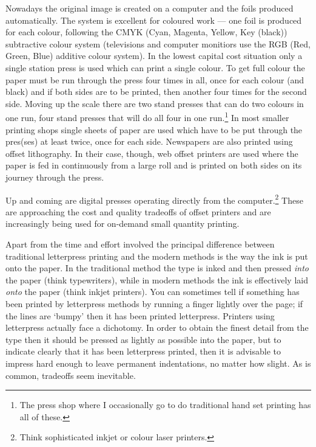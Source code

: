 \documentclass[10pt,letterpaper,extrafontsizes]{memoir}
\begin{document}
    Nowadays the original image is created on a computer and the foils
produced automatically. The system is excellent for coloured work --- one foil
is produced for each colour, following the CMYK
(Cyan, Magenta, Yellow, Key (black)) subtractive colour system 
(televisions and computer monitiors use the RGB (Red, Green, Blue) 
additive colour system). In the lowest capital cost situation only a
single station press is used which can print a single colour. To get full
colour the paper must be run through the press four times in all, once for
each colour (and black) and if both sides are to be printed, then another
four times for the second side. Moving up
the scale there are two stand presses that can do two colours in one run,
four stand presses that will do all four in one run.\footnote{The press shop
where I occasionally go to do traditional hand set printing has all of these.} 
In most
smaller printing shops single sheets of paper are used which have to be put 
through the pres(ses) at least twice, once for each side. Newspapers are
also printed using offset lithography. In their case, though, web offset
printers are used where the paper is fed in continuously from a large roll and
is printed on both sides on its journey through the press.

    Up and coming are digital presses operating directly from the 
computer.\footnote{Think sophisticated inkjet or colour laser printers.}
These are approaching the cost and quality tradeoffs of offset printers
and are increasingly being used for on-demand small quantity printing. 

   Apart from the time and effort involved the principal difference between
traditional letterpress printing and the modern methods 
is the way the ink is put onto the paper. In the traditional method the type
is inked and then pressed \emph{into} the paper (think typewriters), while 
in modern methods the ink is effectively laid \emph{onto} the paper (think
inkjet printers). You can sometimes tell if something has 
been printed by letterpress methods by running a finger lightly over the page;
if the lines are `bumpy' then it has been printed letterpress. Printers using
letterpress actually face a dichotomy. In order to obtain the finest detail
from the type then it should be pressed as lightly as possible into the paper,
but to indicate clearly that it has been letterpress printed, then it is 
advisable to impress hard enough to leave permanent indentations, no matter
how slight. As is common, tradeoffs seem inevitable.
\end{document}
